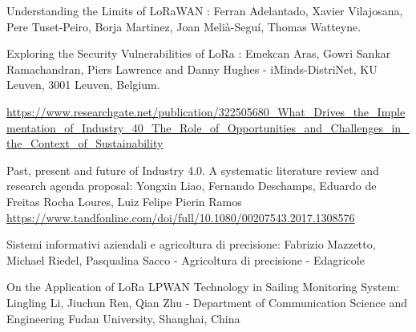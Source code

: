 \documentclass[12pt,a4paper,openright,twoside]{report}
\begin{document}
\begin{thebibliography}{90}
 Understanding the Limits of LoRaWAN : Ferran Adelantado, Xavier Vilajosana, Pere Tuset-Peiro, Borja Martinez, Joan Meli\`a-Seguí, Thomas Watteyne.

 Exploring the Security Vulnerabilities of LoRa :  Emekcan Aras, Gowri Sankar Ramachandran, Piers Lawrence and Danny Hughes - iMinds-DistriNet, KU Leuven, 3001 Leuven, Belgium.

 \hyperref[industry4]{https://www.researchgate.net/publication/322505680\_What\_Drives\_the\_Implementation\_of\_Industry\_40\_The\_Role\_of\_Opportunities\_and\_Challenges\_in\_the\_Context\_of\_Sustainability}

 Past, present and future of Industry 4.0. A systematic literature review and research agenda proposal: Yongxin Liao, Fernando Deschamps, Eduardo de Freitas Rocha Loures, Luiz Felipe Pierin Ramos
\hyperref[industry4]{https://www.tandfonline.com/doi/full/10.1080/00207543.2017.1308576}

 Sistemi informativi aziendali e agricoltura di precisione: Fabrizio Mazzetto, Michael Riedel, Pasqualina Sacco - Agricoltura di precisione - Edagricole  

 On the Application of LoRa LPWAN Technology in Sailing Monitoring System: Lingling Li, Jiuchun Ren, Qian Zhu - Department of Communication Science and Engineering
Fudan University, Shanghai, China

\end{thebibliography}
\end{document}
